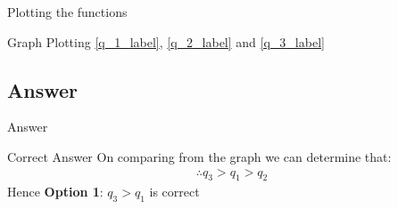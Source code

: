 \documentclass{beamer}
\begin{document}
\begin{frame}{Plotting the functions}
\begin{block}{Graph}
    Plotting \eqref{q_1_label}, \eqref{q_2_label} and \eqref{q_3_label}
    
\begin{center}
\end{center}

\end{block}
    
\end{frame}
\subsection{Answer}

\begin{frame}{Answer}
\begin{block}{Correct Answer}
     On comparing from the graph we can determine that:
    \begin{align}
    \therefore q_3>q_1>q_2
\end{align}
    Hence \textbf{Option 1}: $q_3>q_1$ is correct
\end{block}
   
\end{frame}
\end{document}
